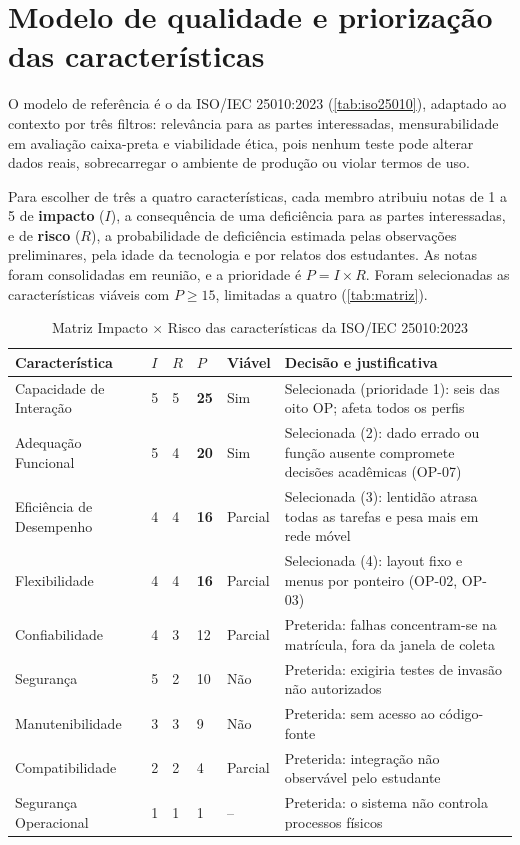 \section{Modelo de qualidade e priorização das características}
\label{sec:priorizacao}

O modelo de referência é o da ISO/IEC 25010:2023 (\autoref{tab:iso25010}), adaptado ao contexto por três filtros: relevância para as partes interessadas, mensurabilidade em avaliação caixa-preta e viabilidade ética, pois nenhum teste pode alterar dados reais, sobrecarregar o ambiente de produção ou violar termos de uso.

Para escolher de três a quatro características, cada membro atribuiu notas de 1 a 5 de \textbf{impacto} ($I$), a consequência de uma deficiência para as partes interessadas, e de \textbf{risco} ($R$), a probabilidade de deficiência estimada pelas observações preliminares, pela idade da tecnologia e por relatos dos estudantes. As notas foram consolidadas em reunião, e a prioridade é $P = I \times R$. Foram selecionadas as características viáveis com $P \geq 15$, limitadas a quatro (\autoref{tab:matriz}).

\begin{table}[htb]
	\caption{Matriz Impacto $\times$ Risco das características da ISO/IEC 25010:2023}
	\label{tab:matriz}
	\centering
	\scriptsize
	\begin{tabularx}{\textwidth}{L{3.4cm} C{0.5cm} C{0.5cm} C{0.9cm} C{1.4cm} Y}
		\toprule
		\textbf{Característica} & \textbf{$I$} & \textbf{$R$} & \textbf{$P$} & \textbf{Viável} & \textbf{Decisão e justificativa} \\
		\midrule
		Capacidade de Interação & 5 & 5 & \textbf{25} & Sim & Selecionada (prioridade 1): seis das oito OP; afeta todos os perfis \\
		Adequação Funcional & 5 & 4 & \textbf{20} & Sim & Selecionada (2): dado errado ou função ausente compromete decisões acadêmicas (OP-07) \\
		Eficiência de Desempenho & 4 & 4 & \textbf{16} & Parcial & Selecionada (3): lentidão atrasa todas as tarefas e pesa mais em rede móvel \\
		Flexibilidade & 4 & 4 & \textbf{16} & Parcial & Selecionada (4): layout fixo e menus por ponteiro (OP-02, OP-03) \\
		Confiabilidade & 4 & 3 & 12 & Parcial & Preterida: falhas concentram-se na matrícula, fora da janela de coleta \\
		Segurança & 5 & 2 & 10 & Não & Preterida: exigiria testes de invasão não autorizados \\
		Manutenibilidade & 3 & 3 & 9 & Não & Preterida: sem acesso ao código-fonte \\
		Compatibilidade & 2 & 2 & 4 & Parcial & Preterida: integração não observável pelo estudante \\
		Segurança Operacional & 1 & 1 & 1 & -- & Preterida: o sistema não controla processos físicos \\
		\bottomrule
	\end{tabularx}
\end{table}

